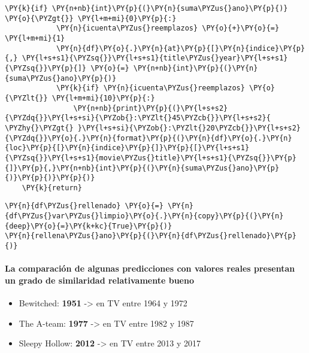 \begin{tcolorbox}[breakable, size=fbox, boxrule=1pt, pad at break*=1mm,colback=cellbackground, colframe=cellborder]
\begin{Verbatim}[commandchars=\\\{\}]
        \PY{k}{if} \PY{n+nb}{int}\PY{p}{(}\PY{n}{suma\PYZus{}ano}\PY{p}{)} \PY{o}{\PYZgt{}} \PY{l+m+mi}{0}\PY{p}{:}
            \PY{n}{icuenta\PYZus{}reemplazos} \PY{o}{+}\PY{o}{=} \PY{l+m+mi}{1}
            \PY{n}{df}\PY{o}{.}\PY{n}{at}\PY{p}{[}\PY{n}{indice}\PY{p}{,} \PY{l+s+s1}{\PYZsq{}}\PY{l+s+s1}{title\PYZus{}year}\PY{l+s+s1}{\PYZsq{}}\PY{p}{]} \PY{o}{=} \PY{n+nb}{int}\PY{p}{(}\PY{n}{suma\PYZus{}ano}\PY{p}{)}
            \PY{k}{if} \PY{n}{icuenta\PYZus{}reemplazos} \PY{o}{\PYZlt{}} \PY{l+m+mi}{10}\PY{p}{:} 
                \PY{n+nb}{print}\PY{p}{(}\PY{l+s+s2}{\PYZdq{}}\PY{l+s+si}{\PYZob{}:\PYZlt{}45\PYZcb{}}\PY{l+s+s2}{ \PYZhy{}\PYZgt{} }\PY{l+s+si}{\PYZob{}:\PYZlt{}20\PYZcb{}}\PY{l+s+s2}{\PYZdq{}}\PY{o}{.}\PY{n}{format}\PY{p}{(}\PY{n}{df}\PY{o}{.}\PY{n}{loc}\PY{p}{[}\PY{n}{indice}\PY{p}{]}\PY{p}{[}\PY{l+s+s1}{\PYZsq{}}\PY{l+s+s1}{movie\PYZus{}title}\PY{l+s+s1}{\PYZsq{}}\PY{p}{]}\PY{p}{,}\PY{n+nb}{int}\PY{p}{(}\PY{n}{suma\PYZus{}ano}\PY{p}{)}\PY{p}{)}\PY{p}{)}
    \PY{k}{return} 
\end{Verbatim}
\end{tcolorbox}

    \begin{tcolorbox}[breakable, size=fbox, boxrule=1pt, pad at break*=1mm,colback=cellbackground, colframe=cellborder]
\begin{Verbatim}[commandchars=\\\{\}]
\PY{n}{df\PYZus{}rellenado} \PY{o}{=} \PY{n}{df\PYZus{}var\PYZus{}limpio}\PY{o}{.}\PY{n}{copy}\PY{p}{(}\PY{n}{deep}\PY{o}{=}\PY{k+kc}{True}\PY{p}{)}
\PY{n}{rellena\PYZus{}ano}\PY{p}{(}\PY{n}{df\PYZus{}rellenado}\PY{p}{)}
\end{Verbatim}
\end{tcolorbox}

    \hypertarget{la-comparaciuxf3n-de-algunas-predicciones-con-valores-reales-presentan-un-grado-de-similaridad-relativamente-bueno}{%
\paragraph{La comparación de algunas predicciones con valores reales
presentan un grado de similaridad relativamente
bueno}\label{la-comparaciuxf3n-de-algunas-predicciones-con-valores-reales-presentan-un-grado-de-similaridad-relativamente-bueno}}

\begin{itemize}
\tightlist
\item
  Bewitched: \textbf{1951} -\textgreater{} en TV entre 1964 y 1972
\item
  The A-team: \textbf{1977} -\textgreater{} en TV entre 1982 y 1987
\item
  Sleepy Hollow: \textbf{2012} -\textgreater{} en TV entre 2013 y 2017
\end{itemize}

